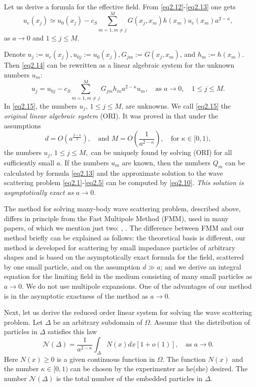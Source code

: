 \documentclass{wap}
\newcommand{\be}{\begin{equation}}
\newcommand{\ee}{\end{equation}}
\begin{document}
Let us derive a formula for the effective field. From \eqref{eq2.12}-\eqref{eq2.13} one gets
\be \label{eq2.14}
    u_e(x_j) \simeq u_0(x_j)-c_S\sum_{m=1, m \neq j}^M G(x_j,x_m)h(x_m)u_e(x_m)a^{2-\kappa},
\ee
as $a \to 0$ and $1 \leq j \leq M$.

Denote $u_j:=u_e(x_j),  u_{0j}:=u_0(x_j), G_{jm}:=G(x_j,x_m)$, and $h_m:=h(x_m)$. Then \eqref{eq2.14} can be rewritten as
a linear algebraic system for the unknown numbers $u_m$:
\be \label{eq2.15}
    u_j = u_{0j}-c_S\sum_{m=1, m \neq j}^M G_{jm} h_m a^{2-\kappa} u_m, \quad\text{as } a \to 0, \quad 1 \leq j \leq M.
\ee
In \eqref{eq2.15}, the numbers $u_j$, $1 \le j \le M$, are unknowns. We call \eqref{eq2.15} the  \textit{original linear algebraic system} (ORI). It was proved in \cite{R635} that under the assumptions
\be \label{eq2.16}
    d=O\left(a^{\frac{2-\kappa}{3}}\right), \quad\text{and } M=O\left(\frac{1}{a^{2-\kappa}}\right), \quad\text{for } \kappa \in [0,1),
\ee
the numbers $u_j$, $1 \leq j \leq M,$ can be uniquely found by solving (ORI) for all sufficiently small $a$. If the numbers $u_m$ are known,
then the numbers $Q_m$ can be calculated by formula \eqref{eq2.13} and the approximate solution to the wave scattering problem \eqref{eq2.1}-\eqref{eq2.5} can be computed by \eqref{eq2.10}. {\em This solution is asymptotically exact as $a \to 0$.}

The method for solving many-body wave scattering problem, described above, differs in principle from the Fast Multipole Method (FMM), used in many papers, of which we mention just two: \cite{GR1987}, \cite{GR1997}.
The difference between FMM and our method briefly can be explained as follows: the theoretical basis is different, our method is developed
for scattering by small impedance particles of arbitrary shapes and is based on the asymptotically exact formula for the field, scattered by one small particle, and on the assumption $d \gg a$; and we derive an integral equation for the limiting field in the medium consisting of many small particles as $a\to 0$. We do not use multipole expansions. One of the advantages of our method is in the asymptotic exactness of the method as $a \to 0$.

Next, let us derive the reduced order linear system for solving the wave scattering problem. Let $\Delta$ be an arbitrary subdomain of $\Omega$. Assume that the distribution of particles in $\Delta$ satisfies this law
\be \label{eq2.17}
    \mathcal{N}(\Delta)=\frac{1}{a^{2-\kappa}} \int_{\Delta} N(x)dx[1+o(1)], \quad\text{as } a \to 0.
\ee
Here $N(x) \ge 0$ is a given continuous function in $\Omega$. The function  $N(x)$ and the number $\kappa\in [0,1)$ can be chosen
by the experimenter as he(she) desired. The number $\mathcal{N}(\Delta)$ is the total number of the embedded particles in $\Delta$.
\end{document}
